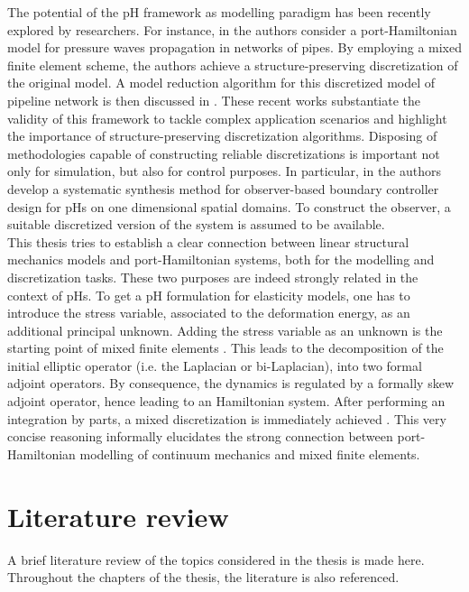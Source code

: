 The potential of the pH framework as modelling paradigm has been recently explored by researchers. For instance, in \cite{egger2018damped} the authors consider a port-Hamiltonian model for pressure waves propagation in networks of pipes. By employing a mixed finite element scheme, the authors achieve a structure-preserving discretization of the original model. A model reduction algorithm for this discretized model of pipeline network is then discussed in \cite{egger2018}. These recent works substantiate the validity of this framework to tackle complex application scenarios and highlight the importance of structure-preserving discretization algorithms. Disposing of methodologies capable of constructing reliable discretizations is important not only for simulation, but also for control purposes. In particular, in \cite{toledo2020} the authors develop a systematic synthesis method for observer-based boundary controller design for pHs on one dimensional spatial domains. To construct the observer, a suitable discretized version of the system is assumed to be available. \\

This thesis tries to establish a clear connection between linear structural mechanics models and port-Hamiltonian systems, both for the modelling and discretization tasks. These two purposes are indeed strongly related in the context of pHs. To get a pH formulation for elasticity models, one has to introduce the stress variable, associated to the deformation energy, as an additional principal unknown. Adding the stress variable as an unknown is the starting point of mixed finite elements \cite{arnold1990intro}. This leads to the decomposition of the initial elliptic operator (i.e. the Laplacian or bi-Laplacian), into two formal adjoint operators. By consequence, the dynamics is regulated by a formally skew adjoint operator, hence leading to an Hamiltonian system. After performing an integration by parts, a mixed discretization is immediately achieved \cite{joly2003variational}. This very concise reasoning informally elucidates the strong connection between port-Hamiltonian modelling of continuum mechanics and mixed finite elements. 


\section{Literature review}
A brief literature review of the topics considered in the thesis is made here. Throughout the chapters of the thesis, the literature is also referenced.


